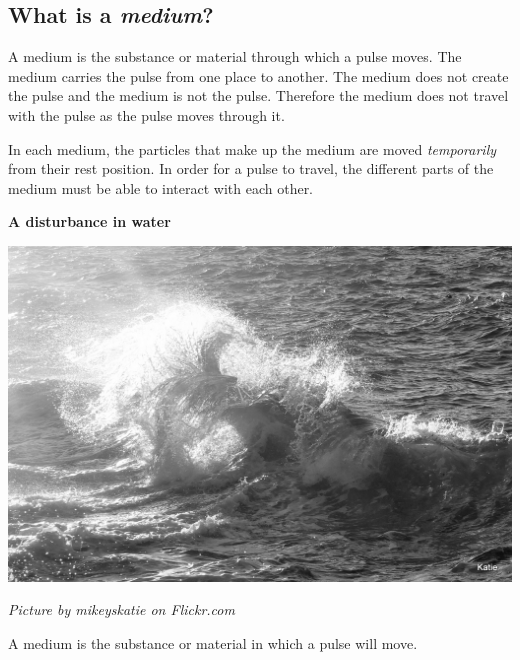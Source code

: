             \subsection*{What is a \textsl{medium}?}
            \nopagebreak
\begin{minipage}{.5\textwidth}
      \label{m38801*id312816}A medium is the substance or material through which a pulse moves. The medium carries the pulse from one place to another. The medium does not create the pulse and the medium is not the pulse. Therefore the medium does not travel with the pulse as the pulse moves through it. \par %
\label{m38801*id312841}In each medium, the particles that make up the medium are moved \textsl{temporarily} from their rest position. In order for a pulse to travel, the different parts of the medium must be able to interact with each other.\par 

\end{minipage}
\begin{minipage}{.5\textwidth}
\begin{center}
\textbf{A disturbance in water}\par
 \includegraphics[width=.8\textwidth]{photos/waveby-mikeyskatie-flickr.jpg}\par
\textit{\small Picture by mikeyskatie on Flickr.com}
\end{center}
\end{minipage}


\label{m38801*fhsst!!!underscore!!!id51}


\pagebreak      
    \label{m38801*cid4}
 { \label{m38801*meaningfhsst!!!underscore!!!id51}
      \label{m38801*id312830}A medium is the substance or material in which a pulse will move. \par 
       } 
           
